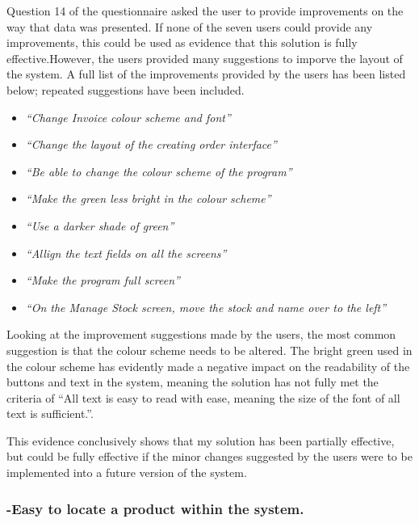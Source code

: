 Question 14 of the questionnaire asked the user to provide improvements on the way that data was presented. If none of the seven users could provide any improvements, this could be used as evidence that this solution is fully effective.However, the users provided many suggestions to imporve the layout of the system. A full list of the improvements provided by the users has been listed below; repeated suggestions have been included.

\begin{itemize}
\item{\large{\textit{``Change Invoice colour scheme and font''}}}
\item{\large{\textit{``Change the layout of the creating order interface''}}}
\item{\large{\textit{``Be able to change the colour scheme of the program''}}}
\item{\large{\textit{``Make the green less bright in the colour scheme''}}}
\item{\large{\textit{``Use a darker shade of green''}}}
\item{\large{\textit{``Allign the text fields on all the screens''}}}
\item{\large{\textit{``Make the program full screen''}}}
\item{\large{\textit{``On the Manage Stock screen, move the stock and name over to the left''}}}
\end{itemize}

Looking at the improvement suggestions made by the users, the most common suggestion is that the colour scheme needs to be altered. The bright green used in the colour scheme has evidently made a negative impact on the readability of the buttons and text in the system, meaning the solution has not fully met the criteria of ``All text is easy to read with ease, meaning the size of the font of all text is sufficient.''.

This evidence conclusively shows that my solution has been partially effective, but could be fully effective if the minor changes suggested by the users were to be implemented into a future version of the system.





\pagebreak
\subsubsection{-Easy to locate a product within the system.}
\label{fig:search-evidence}

